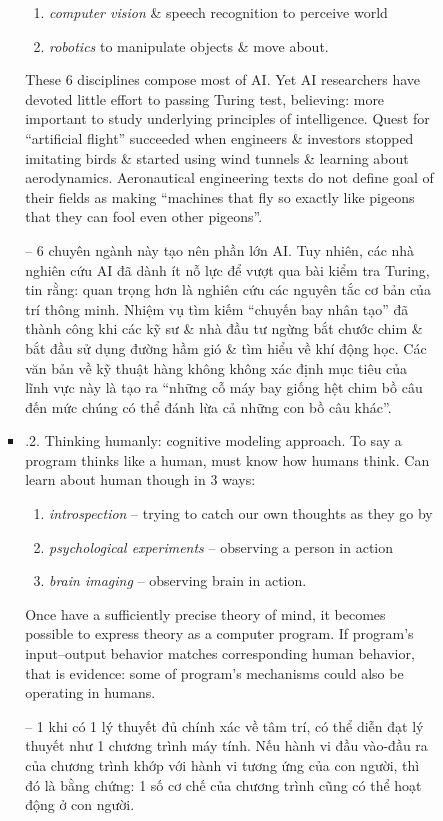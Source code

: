 \documentclass{article}
\begin{document}
\begin{itemize}
\begin{itemize}
\begin{itemize}
\begin{itemize}
\begin{enumerate}
					\item {\it computer vision} \& speech recognition to perceive world
					\item {\it robotics} to manipulate objects \& move about.
				\end{enumerate}
				These 6 disciplines compose most of AI. Yet AI researchers have devoted little effort to passing Turing test, believing: more important to study underlying principles of intelligence. Quest for ``artificial flight'' succeeded when engineers \& investors stopped imitating birds \& started using wind tunnels \& learning about aerodynamics. Aeronautical engineering texts do not define goal of their fields as making ``machines that fly so exactly like pigeons that they can fool even other pigeons''.

				-- 6 chuyên ngành này tạo nên phần lớn AI. Tuy nhiên, các nhà nghiên cứu AI đã dành ít nỗ lực để vượt qua bài kiểm tra Turing, tin rằng: quan trọng hơn là nghiên cứu các nguyên tắc cơ bản của trí thông minh. Nhiệm vụ tìm kiếm ``chuyến bay nhân tạo'' đã thành công khi các kỹ sư \& nhà đầu tư ngừng bắt chước chim \& bắt đầu sử dụng đường hầm gió \& tìm hiểu về khí động học. Các văn bản về kỹ thuật hàng không không xác định mục tiêu của lĩnh vực này là tạo ra ``những cỗ máy bay giống hệt chim bồ câu đến mức chúng có thể đánh lừa cả những con bồ câu khác''.
				\item {.2. Thinking humanly: cognitive modeling approach.} To say a program thinks like a human, must know how humans think. Can learn about human though in 3 ways:
				\begin{enumerate}
					\item {\it introspection} -- trying to catch our own thoughts as they go by
					\item {\it psychological experiments} -- observing a person in action
					\item {\it brain imaging} -- observing brain in action.
				\end{enumerate}
				Once have a sufficiently precise theory of mind, it becomes possible to express theory as a computer program. If program's input--output behavior matches corresponding human behavior, that is evidence: some of program's mechanisms could also be operating in humans.

				-- 1 khi có 1 lý thuyết đủ chính xác về tâm trí, có thể diễn đạt lý thuyết như 1 chương trình máy tính. Nếu hành vi đầu vào-đầu ra của chương trình khớp với hành vi tương ứng của con người, thì đó là bằng chứng: 1 số cơ chế của chương trình cũng có thể hoạt động ở con người.


\end{itemize}
\end{itemize}
\end{itemize}
\end{itemize}
\end{document}
